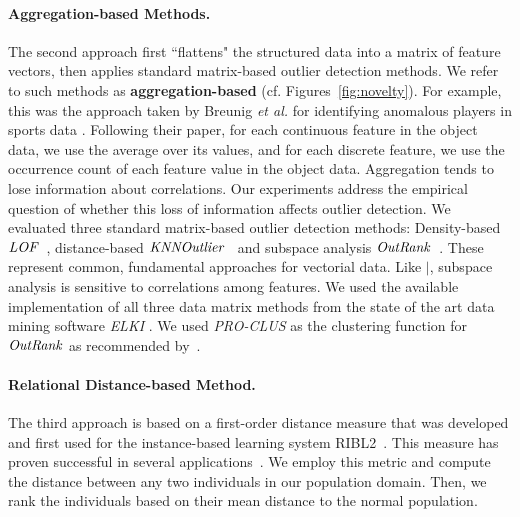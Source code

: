 {					%
					\paragraph{Aggregation-based Methods.}
					The second approach first ``flattens" the structured data into a matrix of feature vectors, then applies standard matrix-based outlier detection methods. We refer to such methods as \textbf{aggregation-based}
					(cf. Figures~\ref{fig:novelty}). For example, this was the approach taken by Breunig {\em et al.} for identifying anomalous players in sports data \citep{Breunig2000}. Following their paper, for each continuous feature in the object data, we use the average over its values, and for each discrete feature, we use the occurrence count of each feature value in the object data. Aggregation 
					tends to lose information about correlations.
					Our experiments address the empirical question of whether this loss of information affects outlier detection. 
					We evaluated three standard matrix-based outlier detection methods: Density-based $\it{LOF}$~\citep{Breunig2000}, distance-based $\it{KNNOutlier}$~\citep{Ramaswamy2000} and subspace analysis $\it{OutRank}$~\citep{Muller2012}.
					These represent common, fundamental  approaches for vectorial data. 
					Like $\mid$, subspace analysis is sensitive to correlations among features. 
					We used the available implementation of all three data matrix methods from the state of the art data mining software \textit{ELKI} \citep{Elke2013}. We used \textit{PRO-CLUS} as the clustering function for $\it{OutRank}$ as recommended by~\citep{Muller2012}.
					
						\paragraph{Relational Distance-based Method.}
						The third approach is based on a first-order distance measure that was developed and first used for the instance-based learning system RIBL2~\citep{Horvath2001}. This measure has proven  successful in several applications~\citep{Kirsten2001,Horvath1999}. We employ this metric and compute the distance between any two individuals in our population domain. Then, we rank the individuals based on their mean distance to the normal population.
					
}
